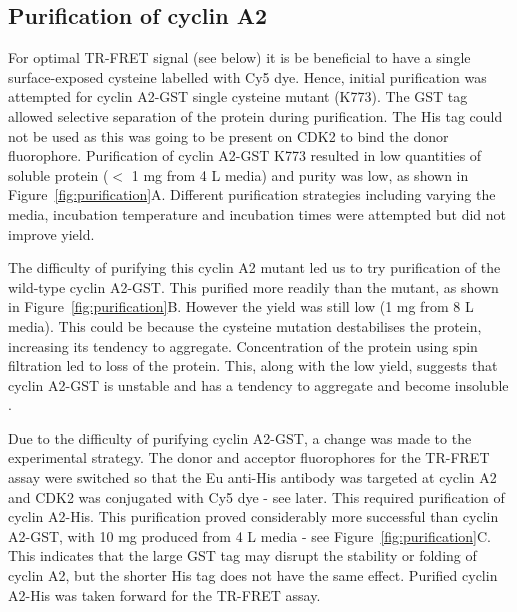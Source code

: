 \subsection{Purification of cyclin A2}

For optimal TR-FRET signal (see below) it is be beneficial to have a single surface-exposed cysteine labelled with Cy5 dye.
Hence, initial purification was attempted for cyclin A2-GST single cysteine mutant (K773).
The GST tag allowed selective separation of the protein during purification.
The His tag could not be used as this was going to be present on CDK2 to bind the donor fluorophore.
Purification of cyclin A2-GST K773 resulted in low quantities of soluble protein ($<$ 1 mg from 4 L media) and purity was low, as shown in Figure~\ref{fig:purification}A.
Different purification strategies including varying the media, incubation temperature and incubation times were attempted but did not improve yield.

The difficulty of purifying this cyclin A2 mutant led us to try purification of the wild-type cyclin A2-GST.
This purified more readily than the mutant, as shown in Figure~\ref{fig:purification}B.
However the yield was still low (1 mg from 8 L media).
This could be because the cysteine mutation destabilises the protein, increasing its tendency to aggregate.
Concentration of the protein using spin filtration led to loss of the protein.
This, along with the low yield, suggests that cyclin A2-GST is unstable and has a tendency to aggregate and become insoluble \cite{Brown2015}.

Due to the difficulty of purifying cyclin A2-GST, a change was made to the experimental strategy.
The donor and acceptor fluorophores for the TR-FRET assay were switched so that the Eu anti-His antibody was targeted at cyclin A2 and CDK2 was conjugated with Cy5 dye - see later.
This required purification of cyclin A2-His.
This purification proved considerably more successful than cyclin A2-GST, with 10 mg produced from 4 L media - see Figure~\ref{fig:purification}C.
This indicates that the large GST tag may disrupt the stability or folding of cyclin A2, but the shorter His tag does not have the same effect.
Purified cyclin A2-His was taken forward for the TR-FRET assay.


